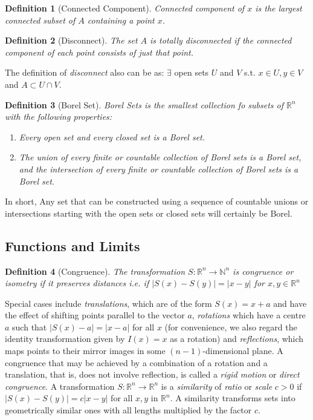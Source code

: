 \documentclass[12pt, a4paper]{article}
\newtheorem{definition}{Definition}[subsection]
\begin{document}
\begin{definition}[Connected Component]
Connected component of $x$ is the largest connected subset of $A$ containing a point $x$.
\end{definition}

\begin{definition}[Disconnect]
    The set $A$ is totally disconnected if the connected component of each point consists of just that point.
\end{definition}

The definition of \textit{disconnect} also can be as: $\exists$ open sets $U$ and $V$ s.t. $x\in U, y\in V$ and $A\subset U\cap V$.

\begin{definition}[Borel Set]
    Borel Sets is the smallest collection fo subsets of $\mathbb{R}^n$ with the following properties:
    \begin{enumerate}
        \item Every open set and every closed set is a Borel set.
        \item The union of every finite or countable collection of Borel sets is a Borel set, and the intersection of every finite or countable collection of Borel sets is a Borel set.
    \end{enumerate}
\end{definition}

In short, Any set that can be constructed using a sequence of countable unions or intersections starting with the open sets or closed sets will certainly be Borel.

\subsection{Functions and Limits}

\begin{definition}[Congruence]
    The transformation $S : \mathbb{R}^n\rightarrow \mathbb{N}^n$ is congruence or isometry if it preserves distances i.e. if $|S(x)-S(y)| = |x-y|$ for $x, y\in \mathbb{R}^n$
    
\end{definition}

Special cases include \textit{translations}, which are of the form 
$S(x)=x+a$ and have the effect of shifting points parallel 
to the vector $a$, \textit{rotations} which have a centre $a$ such 
that $|S(x)-a|=|x-a|$ for all $x$ (for convenience, we also 
regard the identity transformation given by $I(x)=x$ as a 
rotation) and \textit{reflections}, which maps points to their mirror 
images in some $(n-1)$-dimensional plane. A congruence that 
may be achieved by a combination of a rotation and a translation, 
that is, does not involve reflection, is called a \textit{rigid motion} or 
\textit{direct congruence}. A transformation 
$S: \mathbb{R}^{n} \rightarrow \mathbb{R}^{n}$ is a \textit{similarity} of 
\textit{ratio} or \textit{scale} $c>0$ if $|S(x)-S(y)|=c|x-y|$ for all $x, y$ 
in $\mathbb{R}^{n} .$ A similarity transforms sets into geometrically 
similar ones with all lengths multiplied by the factor $c$.
\end{document}
